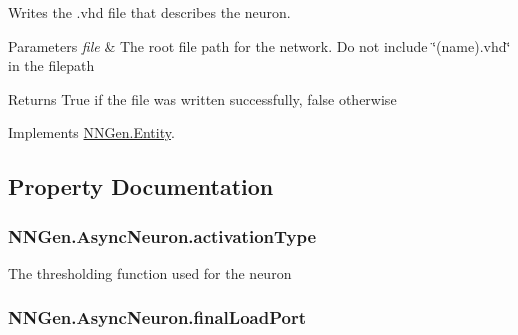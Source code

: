Writes the .vhd file that describes the neuron. 


\begin{DoxyParams}{Parameters}
{\em file} & The root file path for the network. Do not include \char`\"{}(name).\+vhd\char`\"{} in the filepath\\
\hline
\end{DoxyParams}
\begin{DoxyReturn}{Returns}
True if the file was written successfully, false otherwise
\end{DoxyReturn}


Implements \hyperlink{class_n_n_gen_1_1_entity_a1111d498446be08b20583b9625893a52}{N\+N\+Gen.\+Entity}.



\subsection{Property Documentation}
\hypertarget{class_n_n_gen_1_1_async_neuron_aafa1d92f75c77c36546567c214840818}{}
\subsubsection[{activation\+Type}]{ N\+N\+Gen.\+Async\+Neuron.\+activation\+Type\hspace{0.3cm}{\ttfamily [get]}}\label{class_n_n_gen_1_1_async_neuron_aafa1d92f75c77c36546567c214840818}


The thresholding function used for the neuron 

\hypertarget{class_n_n_gen_1_1_async_neuron_a06f594e2b75be48f0444010a2204d7b2}{}
\subsubsection[{final\+Load\+Port}]{ N\+N\+Gen.\+Async\+Neuron.\+final\+Load\+Port\hspace{0.3cm}{\ttfamily [get]}}\label{class_n_n_gen_1_1_async_neuron_a06f594e2b75be48f0444010a2204d7b2}


